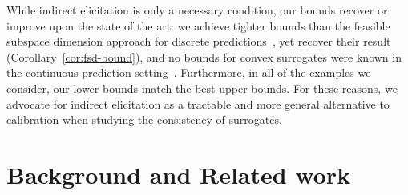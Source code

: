 \documentclass{article}
\newcommand{\Comments}{1}
\newcommand{\mynote}[2]{\ifnum\Comments=1\textcolor{#1}{#2}\fi}
\newcommand{\mytodo}[2]{\ifnum\Comments=1%
	\todo[linecolor=#1!80!black,backgroundcolor=#1,bordercolor=#1!80!black]{#2}\fi}
\newcommand{\raf}[1]{\mynote{green!80!blue}{[RF: #1]}}
\newcommand{\raft}[1]{\mytodo{green!20!white}{RF: #1}}
\newcommand{\jessiet}[1]{\mytodo{purple!20!white}{JF: #1}}
\newcommand{\reals}{\mathbb{R}}
\newcommand{\Y}{\mathcal{Y}}
\begin{document}
While indirect elicitation is only a necessary condition, our bounds recover or improve upon the state of the art:
we achieve tighter bounds than the feasible subspace dimension approach for discrete predictions~\citep{ramaswamy2016convex}, yet recover their result (Corollary~\ref{cor:fsd-bound}), and no bounds for convex surrogates were known in the continuous prediction setting~\citep{frongillo2018elicitation}.
Furthermore, in all of the examples we consider, our lower bounds match the best upper bounds.
For these reasons, we advocate for indirect elicitation as a tractable and more general alternative to calibration when studying the consistency of surrogates.




\section{Background and Related work}\label{sec:related-work}
\end{document}

